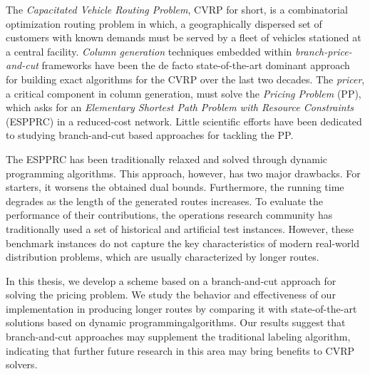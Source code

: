 {
\setlength\parindent{0pt}

The \textit{Capacitated Vehicle Routing Problem}, CVRP for short,
is a combinatorial optimization routing problem in which,
a geographically dispersed set of customers with known demands
must be served by a fleet of vehicles stationed at a central facility.
\textit{Column generation} techniques embedded within \textit{branch-price-and-cut} frameworks
have been the de facto state-of-the-art dominant approach
for building exact algorithms for the CVRP over the last two decades.
The \textit{pricer}, a critical component in column generation, must solve
the \textit{Pricing Problem} (PP), which asks for an
\textit{Elementary Shortest Path Problem with Resource Constraints} (ESPPRC)
in a reduced-cost network.
Little scientific efforts have been dedicated to studying
branch-and-cut based approaches for tackling the PP.

The ESPPRC has been traditionally relaxed and solved through dynamic programming algorithms.
This approach, however, has two major drawbacks.
For starters, it worsens the obtained dual bounds.
Furthermore, the running time degrades as the length of the generated routes increases.
To evaluate the performance of their contributions, the operations research community has traditionally used a set of historical and artificial test instances.
However, these benchmark instances do not capture the key characteristics of modern real-world distribution problems, which are usually characterized by longer routes.

In this thesis, we develop
a scheme based on a branch-and-cut approach for solving the pricing problem.
We study the behavior and effectiveness of our implementation in producing longer routes by comparing it with state-of-the-art solutions based on dynamic programmingalgorithms.
Our results suggest that branch-and-cut approaches may supplement the traditional labeling algorithm, indicating that further future research in this area may bring benefits to CVRP solvers.
}
